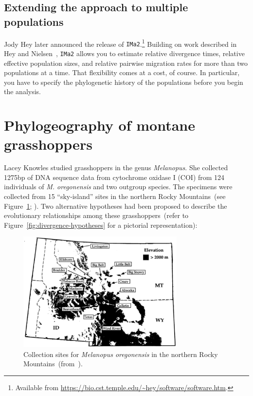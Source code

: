 \subsection*{Extending the approach to multiple populations}

Jody Hey later announced the release of {\tt IMa2}.\footnote{Available
  from \url{https://bio.cst.temple.edu/~hey/software/software.htm}.}
Building on work described in Hey and
Nielsen~\cite{Hey-Nielsen-2004,Hey-Nielsen-2007}, {\tt IMa2} allows
you to estimate relative divergence times, relative effective
population sizes, and relative pairwise migration rates for more than
two populations at a time. That flexibility comes at a cost, of
course. In particular, you have to specify the phylogenetic history of
the populations before you begin the analysis.

\section*{Phylogeography of montane grasshoppers}

Lacey Knowles studied grasshoppers in the genus {\it Melanopus}. She
collected 1275bp of DNA sequence data from cytochrome oxidase I (COI)
from 124 individuals of {\it M. oregonensis\/} and two outgroup
species. The specimens were collected from 15 ``sky-island'' sites in
the northern Rocky Mountains~(see Figure~\ref{fig:sky-islands};
\cite{Knowles-2001}). Two alternative hypotheses had been proposed to
describe the evolutionary relationships among these
grasshoppers~(refer to Figure~\ref{fig:divergence-hypotheses} for a
pictorial representation):

\begin{figure}
\begin{center}
\includegraphics[height=6cm]{sky-islands.eps}
\end{center}
\caption{Collection sites for {\it Melanopus oregonensis\/} in the
  northern Rocky Mountains~(from~\cite{Knowles-2001}).}\label{fig:sky-islands}
\end{figure}

